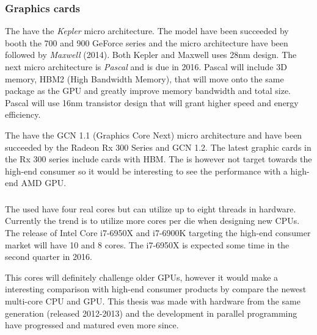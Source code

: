 \subsubsection{Graphics cards}

The {\NVCARD} have the \textit{Kepler} micro architecture. The model have been succeeded by booth the 700 and 900 GeForce series and the micro architecture have been followed by \textit{Maxwell} (2014). Both Kepler and Maxwell uses 28nm design. The next micro architecture is \textit{Pascal} and is due in 2016. Pascal will include 3D memory, HBM2 (High Bandwidth Memory), that will move onto the same package as the GPU and greatly improve memory bandwidth and total size. Pascal will use 16nm transistor design that will grant higher speed and energy efficiency.

The {\AMDCARD} have the GCN 1.1 (Graphics Core Next) micro architecture and have been succeeded by the Radeon Rx 300 Series and GCN 1.2. The latest graphic cards in the Rx 300 series include cards with HBM. The {\AMDCARD} is however not target towards the high-end consumer so it would be interesting to see the performance with a high-end AMD GPU.

\subsubsection{\INTELCPU}

The used {\INTELCPU} have four real cores but can utilize up to eight threads in hardware. Currently the trend is to utilize more cores per die when designing new CPUs. The release of Intel Core i7-6950X and i7-6900K targeting the high-end consumer market will have 10 and 8 cores. The i7-6950X is expected some time in the second quarter in 2016.

This cores will definitely challenge older GPUs, however it would make a interesting comparison with high-end consumer products by compare the newest multi-core CPU and GPU. This thesis was made with hardware from the same generation (released 2012-2013) and the development in parallel programming have progressed and matured even more since.